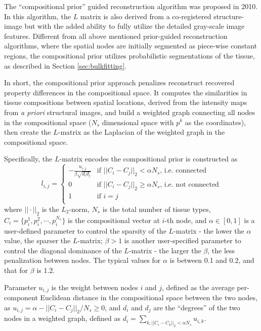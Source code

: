 \documentclass[12pt]{book}               %
\begin{document}
The ``compositional prior'' guided reconstruction algorithm was proposed in 2010. In this algorithm, the $L$ matrix is also derived from a co-registered structure-image but with the added ability to fully utilize the detailed gray-scale image features. Different from all above mentioned prior-guided reconstruction algorithms, where the spatial nodes are initially segmented as piece-wise constant regions, the compositional prior utilizes probabilistic segmentations of the tissue, as described in Section \ref{sec:bulkfitting}. 

In short, the compositional prior approach penalizes reconstruct recovered property differences in the compositional space. It
computes the similarities in tissue compositions between spatial locations, derived from the intensity maps from \emph{a priori} structural images, and build a weighted graph connecting all nodes in the compositional space ($N_s$ dimensional space with $p^k$ as the coordinates), then create the $L$-matrix as the Laplacian of the weighted graph in the compositional space.

Specifically, the $L$-matrix encodes the compositional prior is constructed as
\begin{equation}
l_{i,j}=\left\{\begin{array}{cl}
-\frac{u_{i,j}}{\beta\sqrt{d_id_j}}& \textrm{if $||C_i-C_j||_2<\alpha N_s$, i.e. connected}\\
0 &\textrm{if $||C_i-C_j||_2\ge\alpha N_s$, i.e. not connected}\\
1 & \textrm{if $i=j$}\\
\end{array}\right.
\end{equation}
where $||\cdot||_2$ is the $L_2$-norm, $N_s$ is the total number of tissue types, $C_i=\{p^1_i,p^2_i,\cdots,p^{N_s}_i\}$ is the compositional vector at $i$-th node, and $\alpha\in[0, 1]$ is a user-defined parameter to control the sparsity of the $L$-matrix - the lower the $\alpha$ value, the sparser the $L$-matrix; $\beta>1$ is another user-specified parameter to control the diagonal dominance of the $L$-matrix - the larger the $\beta$, the less penalization between nodes. The typical values for $\alpha$ is between 0.1 and 0.2, and that for $\beta$ is 1.2. 

Parameter $u_{i,j}$ is the weight between nodes $i$ and $j$, defined as the average per-component Euclidean distance in the compositional space between the two nodes, as $u_{i,j}=\alpha-||C_i-C_j||_2/N_s\ge 0$, and $d_i$ and $d_j$ are the ``degrees'' of the two nodes in a weighted graph, defined as $d_i=\sum_{k,||C_i-C_k||_2<\alpha N_s}{u_{i,k}}$.
\end{document}
